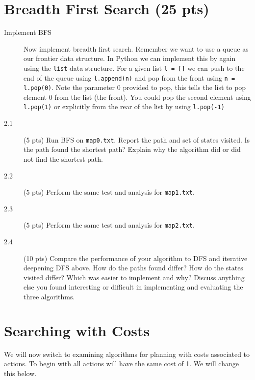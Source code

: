 \documentclass[11pt]{hermans-hw}
\begin{document}
\section{Breadth First Search (25 pts)}
\begin{description}
\item[Implement BFS] Now implement breadth first search. Remember we want to use a queue as our frontier data structure. In Python we can implement this by again using the \texttt{list} data structure. For a given list \texttt{l = []} we can push to the end of the queue using \texttt{l.append(n)} and pop from the front using \texttt{n = l.pop(0)}. Note the parameter 0 provided to pop, this tells the list to pop element 0 from the list (the front). You could pop the second element using \texttt{l.pop(1)} or explicitly from the rear of the list by using \texttt{l.pop(-1)}
\item[2.1] (5 pts) Run BFS on \texttt{map0.txt}. Report the path and set of states visited.
Is the path found the shortest path? Explain why the algorithm did or did not find the shortest path.
\item[2.2] (5 pts) Perform the same test and analysis for \texttt{map1.txt}.
\item[2.3] (5 pts) Perform the same test and analysis for \texttt{map2.txt}.
\item[2.4] (10 pts) Compare the performance of your algorithm to DFS and iterative deepening DFS above. How do the paths found differ? How do the states visited differ? Which was easier to implement and why? Discuss anything else you found interesting or difficult in implementing and evaluating the three algorithms.
\end{description}
\section*{Searching with Costs}
We will now switch to examining algorithms for planning with costs associated to actions.
To begin with all actions will have the same cost of 1. We will change this below.
\end{document}
